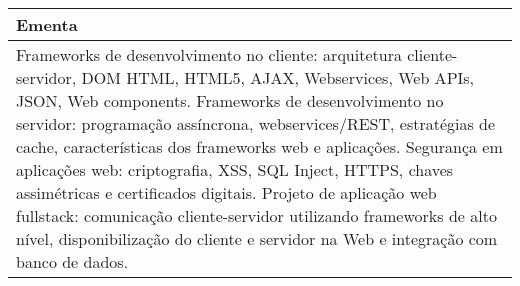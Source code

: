 \begin{quadro}[ht!]
\begin{tabular}{|p{3cm} p{2cm} p{3cm} p{2cm} p{3cm} p{2cm}|}
\multicolumn{6}{|p{15cm}|}{\cellcolor{blue1} Ementa} \\\hline
\hline\multicolumn{6}{|p{15cm}|}{\scriptsize Frameworks de desenvolvimento no cliente: arquitetura cliente-servidor, DOM HTML, HTML5, AJAX, Webservices, Web APIs, JSON, Web components. Frameworks de desenvolvimento no servidor: programação assíncrona, webservices/REST, estratégias de cache, características dos frameworks web e aplicações. Segurança em aplicações web: criptografia, XSS, SQL Inject, HTTPS, chaves assimétricas e certificados digitais. Projeto de aplicação web fullstack: comunicação cliente-servidor utilizando frameworks de alto nível, disponibilização do cliente e servidor na Web e integração com banco de dados.}\\\hline 
\hline
	\end{tabular}
\end{quadro}


